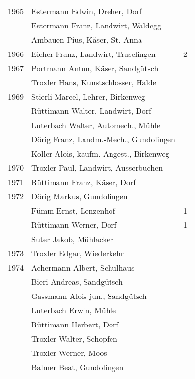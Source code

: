 {\begin{longtable}{ l l r }
        1965          & Estermann Edwin, Dreher, Dorf             &             \\
                      & Estermann Franz, Landwirt, Waldegg        &             \\
                      & Ambauen Pius, Käser, St. Anna             &             \\
        1966          & Eicher Franz, Landwirt, Traselingen       & 2           \\
        1967          & Portmann Anton, Käser, Sandgütsch         &             \\
                      & Troxler Hans, Kunstschlosser, Halde       &             \\
        1969          & Stierli Marcel, Lehrer, Birkenweg         &             \\
                      & Rüttimann Walter, Landwirt, Dorf          &             \\
                      & Luterbach Walter, Automech., Mühle        &             \\
                      & Dörig Franz, Landm.-Mech., Gundolingen    &             \\
                      & Koller Alois, kaufm. Angest., Birkenweg   &             \\
        1970          & Troxler Paul, Landwirt, Ausserbuchen      &             \\
        1971          & Rüttimann Franz, Käser, Dorf              &             \\
        1972          & Dörig Markus, Gundolingen                 &             \\
                      & Fümm Ernst, Lenzenhof                     & 1           \\
                      & Rüttimann Werner, Dorf                    & 1           \\
                      & Suter Jakob, Mühlacker                    &             \\
        1973          & Troxler Edgar, Wiederkehr                 &             \\
        1974          & Achermann Albert, Schulhaus               &             \\
                      & Bieri Andreas, Sandgütsch                 &             \\
                      & Gassmann Alois jun., Sandgütsch           &             \\
                      & Luterbach Erwin, Mühle                    &             \\
                      & Rüttimann Herbert, Dorf                   &             \\
                      & Troxler Walter, Schopfen                  &             \\
                      & Troxler Werner, Moos                      &             \\
                      & Balmer Beat, Gundolingen                  &             \\
    \end{longtable}
    \unskip
    \unpenalty
    \unpenalty}

\begin{history}

    \unvbox\ltmcbox

\end{history}